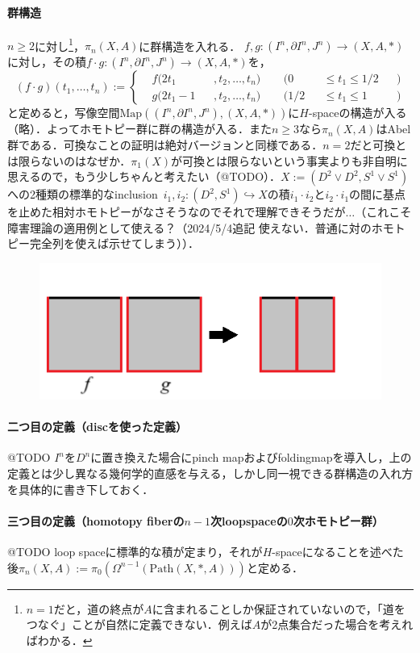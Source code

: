 \documentclass[a4paper,11pt]{jsarticle}
\theoremstyle{definition}
\begin{document}
\paragraph{群構造}
$n\ge 2$に対し\footnote{$n=1$だと，道の終点が$A$に含まれることしか保証されていないので，「道をつなぐ」ことが自然に定義できない．例えば$A$が2点集合だった場合を考えればわかる．}，$\pi_n(X,A)$に群構造を入れる．
$f,g\colon (I^n,\partial I^n,J^n)\to (X,A,*)$に対し，その積$f\cdot g\colon (I^n,\partial I^n,J^n)\to (X,A,*)$を，\[
  (f\cdot g)(t_1,\dots,t_n):=\left\{
  \begin{alignedat}{5}
    &f(2t_1&&,t_2,\dots,t_n)\ \ &&(0&&\le t_1\le 1/2&&)\\
    &g(2t_1-1&&,t_2,\dots,t_n)\ \ &&(1/2&&\le t_1\le 1&&)
  \end{alignedat}\right.
\]と定めると，写像空間$\mathrm{Map}((I^n,\partial I^n,J^n),(X,A,*))$に$H$-spaceの構造が入る（略）．よってホモトピー群に群の構造が入る．また$n\ge 3$なら$\pi_n(X,A)$はAbel群である．可換なことの証明は絶対バージョンと同様である．$n=2$だと可換とは限らないのはなぜか．$\pi_1(X)$が可換とは限らないという事実よりも非自明に思えるので，もう少しちゃんと考えたい（@TODO）．$X:=(D^2\vee D^2,S^1\vee S^1)$への2種類の標準的なinclusion\ $i_1,i_2\colon(D^2,S^1)\hookrightarrow X$の積$i_1\cdot i_2$と$i_2\cdot i_1$の間に基点を止めた相対ホモトピーがなさそうなのでそれで理解できそうだが$\dots$（これこそ障害理論の適用例として使える？（2024/5/4追記 {\color{red}使えない}．普通に対のホモトピー完全列を使えば示せてしまう））．
\begin{figure}[h]
  \centering
  \includegraphics{defOfHomotopyGroup_composition.png}
\end{figure}

\paragraph{二つ目の定義（discを使った定義）}@TODO $I^n$を$D^n$に置き換えた場合にpinch mapおよびfoldingmapを導入し，上の定義とは少し異なる幾何学的直感を与える，しかし同一視できる群構造の入れ方を具体的に書き下しておく．
\paragraph{三つ目の定義（homotopy fiberの$n-1$次loopspaceの$0$次ホモトピー群）}@TODO loop spaceに標準的な積が定まり，それが$H$-spaceになることを述べた後$\pi_n(X,A):=\pi_0(\Omega^{n-1}(\mathrm{Path}(X,{*},A)))$と定める．
\end{document}
